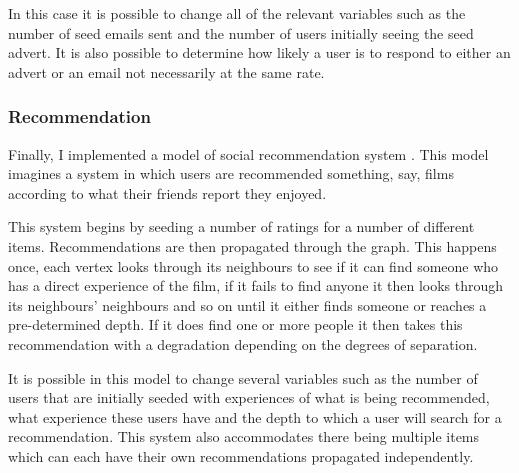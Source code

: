 \documentclass[12pt,a4paper]{article}
\begin{document}
In this case it is possible to change all of the relevant variables such as the number of seed emails sent and the number of users initially seeing the seed advert. It is also possible to determine how likely a user is to respond to either an advert or an email not necessarily at the same rate.

\subsubsection{Recommendation}

Finally, I implemented a model of social recommendation system \cite{walter2008model}. This model imagines a system in which users are recommended something, say, films according to what their friends report they enjoyed.

This system begins by seeding a number of ratings for a number of different items. Recommendations are then propagated through the graph. This happens once, each vertex looks through its neighbours to see if it can find someone who has a direct experience of the film, if it fails to find anyone it then looks through its neighbours' neighbours and so on until it either finds someone or reaches a pre-determined depth. If it does find one or more people it then takes this recommendation with a degradation depending on the degrees of separation.

It is possible in this model to change several variables such as the number of users that are initially seeded with experiences of what is being recommended, what experience these users have and the depth to which a user will search for a recommendation. This system also accommodates there being multiple items which can each have their own recommendations propagated independently.


\end{document}
